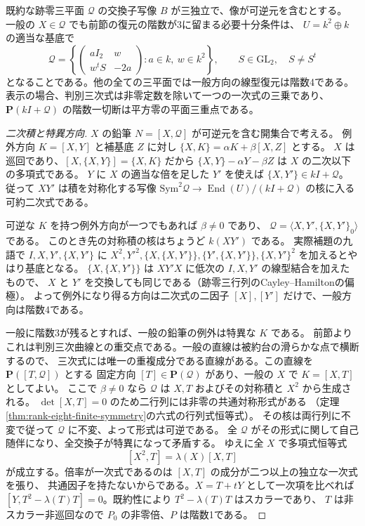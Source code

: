 \begin{theorem}\label{thm:persistent-three-bracket-defect}
既約な跡零三平面 $\mathcal Q$ の交換子写像 $B$ が三独立で、像が可逆元を含むとする。
一般の $X\in\mathcal Q$ でも前節の復元の階数が3に留まる必要十分条件は、
$U=k^2\oplus k$ の適当な基底で
\[
 \mathcal Q=\left\{\begin{pmatrix}aI_2&w\\ w^t S&-2a\end{pmatrix}
               :a\in k,\ w\in k^2\right\},\qquad S\in\mathrm{GL}_2,\quad S\ne S^t
\]
となることである。他の全ての三平面では一般方向の線型復元は階数4である。
表示の場合、判別三次式は非零定数を除いて一つの一次式の三乗であり、
$\mathbf P(kI+\mathcal Q)$ の階数一切断は平方零の平面三重点である。
\end{theorem}
\begin{proof}[二次積と特異方向]
$X$ の鉛筆 $N=[X,\mathcal Q]$ が可逆元を含む開集合で考える。
例外方向 $K=[X,Y]$ と補基底 $Z$ に対し $\{X,K\}=\alpha K+\beta [X,Z]$ とする。
$X$ は巡回であり、$[X,\{X,Y\}]=\{X,K\}$ だから
$\{X,Y\}-\alpha Y-\beta Z$ は $X$ の二次以下の多項式である。
$Y$ に $X$ の適当な倍を足した $Y'$ を使えば $\{X,Y'\}\in kI+\mathcal Q$。
従って $XY'$ は積を対称化する写像
$\mathrm{Sym}^2\mathcal Q\to\operatorname{End}(U)/(kI+\mathcal Q)$ の核に入る可約二次式である。

可逆な $K$ を持つ例外方向が一つでもあれば $\beta\ne0$ であり、
$\mathcal Q=\langle X,Y',\{X,Y'\}_0\rangle$ である。
このとき先の対称積の核はちょうど $k(XY')$ である。
実際補題の九語で $I,X,Y',\{X,Y'\}$ に
$X^2,Y'^2,\{X,\{X,Y'\}\},\{Y',\{X,Y'\}\},\{X,Y'\}^2$ を加えるとやはり基底となる。
$\{X,\{X,Y'\}\}$ は $XY'X$ に低次の $I,X,Y'$ の線型結合を加えたもので、
$X$ と $Y'$ を交換しても同じである（跡零三行列のCayley--Hamiltonの偏極）。
よって例外になり得る方向は二次式の二因子 $[X],[Y']$ だけで、一般方向は階数4である。

一般に階数3が残るとすれば、一般の鉛筆の例外は特異な $K$ である。
前節よりこれは判別三次曲線との重交点である。一般の直線は被約台の滑らかな点で横断するので、
三次式には唯一の重複成分である直線がある。この直線を $\mathbf P([T,\mathcal Q])$ とする
固定方向 $[T]\in\mathbf P(\mathcal Q)$ があり、一般の $X$ で $K=[X,T]$ としてよい。
ここで $\beta\ne0$ なら $\mathcal Q$ は $X,T$ およびその対称積と $X^2$ から生成される。
$\det[X,T]=0$ のため二行列には非零の共通対称形式がある
（定理\ref{thm:rank-eight-finite-symmetry}の六式の行列式恒等式）。
その核は両行列に不変で従って $\mathcal Q$ に不変、よって形式は可逆である。
全 $\mathcal Q$ がその形式に関して自己随伴になり、全交換子が特異になって矛盾する。
ゆえに全 $X$ で多項式恒等式
\[
                    [X^2,T]=\lambda(X)[X,T]
\]
が成立する。倍率が一次式であるのは $[X,T]$ の成分が二つ以上の独立な一次式を張り、
共通因子を持たないからである。$X=T+tY$ として一次項を比べれば
$[Y,T^2-\lambda(T)T]=0$。既約性により $T^2-\lambda(T)T$ はスカラーであり、
$T$ は非スカラー非巡回なので $P_0$ の非零倍、$P$ は階数1である。
\end{proof}

